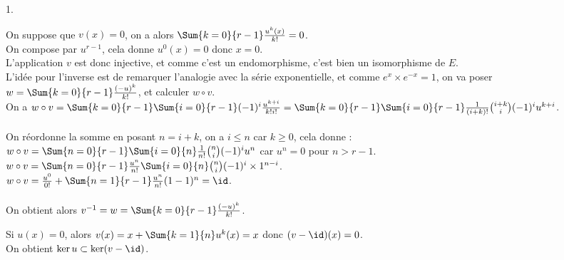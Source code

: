 \documentclass[11pt]{article}%
\begin{document}
\begin{exercice}
\begin{noliste}{1.}
 \item On suppose que $v(x) = 0$, on a alors $\Sum{k = 0}{r-1}
\frac{u^{k} (x)}{k!} = 0$. \\
 On compose par $u^{r-1}$, cela donne $u^{0} (x) = 0$ donc $x = 0$. \\
 L'application $v$ est donc injective, et comme c'est un endomorphisme,
c'est bien un isomorphisme de $E$. \\
 L'idée pour l'inverse est de remarquer l'analogie avec la série
exponentielle, et comme $e^{x} \times e^{-x} = 1$, on va poser $w =
\Sum{k = 0}{r-1} \frac{(-u)^{k} }{k!}$, et calculer $w \circ v$. \\
 On a $w \circ v = \Sum{k = 0}{r-1} \Sum{i = 0}{r-1} (-1)^{i}
\frac{u^{k + i}}{k! i!} \\
\\ = \Sum{k = 0}{r-1} \Sum{i = 0}{r-1} \frac{1}{(i + k)!} \binom{i +
k}{i} (-1)^{i} u^{k + i}$. \\
\\
 On réordonne la somme en posant $n = i + k$, on a $i \leq n$ car $k
\geq 0$, cela donne : \\
 $w \circ v = \Sum{n = 0}{r-1} \Sum{i = 0}{n} \frac{1}{n!} \binom{n}{i}
(-1)^{i} u^{n} $ car $u^{n} = 0$ pour $n > r-1$. \\
 $w \circ v = \Sum{n = 0}{r-1} \frac{u^{n}}{n!} \Sum{i = 0}{n}
\binom{n}{i} (-1)^{i} \times 1^{n-i}$. \\
 $w \circ v = \frac{u^{0}}{0!} + \Sum{n = 1}{r-1} \frac{u^{n}}{n!} (1 -
1)^{n} = \id$. \\
\\
 On obtient alors $v^{-1} = w = \Sum{k = 0}{r-1} \frac{(-u)^{k} }{k!}$.
\\

 \item Si $u(x) = 0$, alors $v(x) = x + \Sum{k = 1}{n} u^{k} (x) = x$
donc $( v -\id) (x) = 0$. \\
 On obtient $\ker u \subset \ker (v - \id)$. \\


\end{noliste}
\end{exercice}
\end{document}
